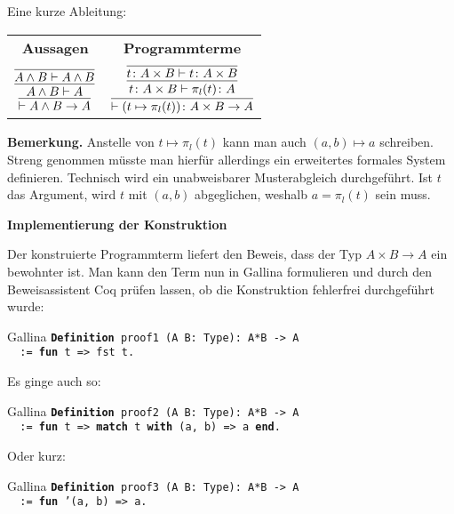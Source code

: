\documentclass[8pt]{beamer}
\newcommand{\strong}[1]{\textsf{\textbf{#1}}}
\newcommand{\parspace}{\vspace{0.8em}}
\newcommand{\cond}{\rightarrow}
\newcommand{\kw}[1]{\textbf{#1}}
\begin{document}
\begin{frame}
Eine kurze Ableitung:

\vspace{1em}
\begin{center}
\begin{tabular}{c@{\qquad\qquad}c}
\strong{Aussagen} & \strong{Programmterme}\\[8pt]
$\infer{\vdash A\land B\cond A}{
  \infer{A\land B\vdash A}{
    \infer{A\land B\vdash A\land B}{}}}$
&
$\infer{\vdash (t\mapsto \pi_l(t))\colon A\times B\to A}{
  \infer{t\colon A\times B\vdash \pi_l(t)\colon A}{
    \infer{t\colon A\times B\vdash t\colon A\times B}{}}}$
\end{tabular}
\end{center}\pause

\parspace
\begin{footnotesize}
\strong{Bemerkung.}
Anstelle von $t\mapsto\pi_l(t)$ kann man auch $(a,b)\mapsto a$
schreiben. Streng genommen müsste man hierfür allerdings ein erweitertes
formales System definieren. Technisch wird ein unabweisbarer
Musterabgleich durchgeführt. Ist $t$ das Argument, wird $t$
mit $(a,b)$ abgeglichen, weshalb $a=\pi_l(t)$ sein muss.
\end{footnotesize}
\end{frame}

\begin{frame}[t]
\strong{Implementierung der Konstruktion}

\vspace{4em}
Der konstruierte Programmterm liefert den Beweis, dass der Typ
$A\times B\to A$ ein bewohnter ist. Man kann den Term nun in
Gallina formulieren und durch den Beweisassistent Coq prüfen lassen,
ob die Konstruktion fehlerfrei durchgeführt wurde:\pause

\begin{block}{Gallina}
\texttt{\kw{Definition} proof1 (A B: Type): A*B -> A\\
\ \ := \kw{fun} t => fst t.}
\end{block}\pause

Es ginge auch so:
\begin{block}{Gallina}
\texttt{\kw{Definition} proof2 (A B: Type): A*B -> A\\
\ \ := \kw{fun} t => \kw{match} t \kw{with} (a, b) => a \kw{end}.}
\end{block}
Oder kurz:
\begin{block}{Gallina}
\texttt{\kw{Definition} proof3 (A B: Type): A*B -> A\\
\ \ := \kw{fun} '(a, b) => a.}
\end{block}
\end{frame}
\end{document}
